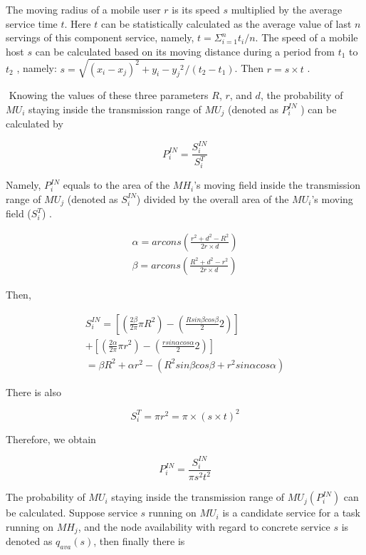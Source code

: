 \documentclass[10pt,journal,compsoc]{IEEEtran}
\begin{document}
The moving radius of a mobile user $r$ is its speed $s$ multiplied by the average service time $t$. Here $t$ can be statistically calculated as the average value of last $n$ servings of this component service, namely, $t = \Sigma_{i=1}^{n}t_i/n$. The speed of a mobile host $s$ can be calculated based on its moving distance during a period from $t_1$ to $t_2$ \cite{ko2000location}, namely: $s = \sqrt{{(x_i-x_j)^2}+{y_i-y_j}^2}/(t_2-t_1)$. Then $r = s \times t$ \cite{Yang2010}.

​	Knowing the values of these three parameters $R$, $r$, and $d$, the probability of $MU_i$ staying inside the transmission range of $MU_j$ (denoted as $P_i^{IN}$ ) can be calculated by

\begin{equation}
P_i^{IN} = \frac{S_i^{IN}}{S_i^T}
\end{equation}

Namely, $P^{IN}_i$ equals to the area of the $MH_i$’s moving field inside the transmission range of $MU_j$ (denoted as $S^{IN}_i$) divided by the overall area of the $MU_i$’s moving field ($S^T_i$) \cite{Yang2010}.

\begin{eqnarray}
\alpha = arcons(\frac{r^2+d^2-R^2}{2r\times d}) \\
\beta = arcons(\frac{R^2+d^2-r^2}{2r\times d})
\end{eqnarray}

Then,

\begin{eqnarray}
S^{IN}_i = [(\frac{2\beta}{2\pi}\pi R^2)-(\frac{R sin\beta cos\beta}{2}2)]\\\nonumber
+ [(\frac{2\alpha}{2\pi}\pi r^2)-(\frac{r sin\alpha cos\alpha}{2}2)]\\\nonumber
= \beta R^2 + \alpha r^2 - (R^2 sin\beta cos\beta + r^2 sin\alpha cos\alpha)
\end{eqnarray}

There is also

\begin{equation}
S_i^T = \pi r^2 = \pi \times (s \times t)^2
\end{equation}

Therefore, we obtain

\begin{equation}
P_i^{IN} = \frac{S_i^{IN}}{\pi s^2 t^2}
\end{equation}

The probability of $MU_i$ staying inside the transmission range of $MU_j (P^{IN}_i)$ can be calculated. Suppose service $s$ running on $MU_i$ is a candidate service for a task running on $MH_j$, and the node availability with regard to concrete service $s$ is denoted as $q_{ava}(s)$, then finally there is
\end{document}
